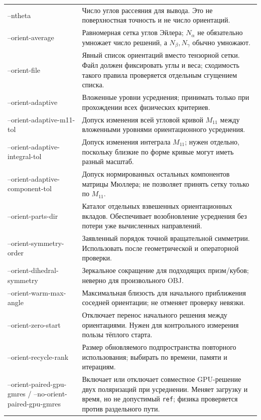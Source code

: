 \documentclass[12pt,a4paper]{article}
\begin{document}
\begin{longtable}{>{\ttfamily\raggedright\arraybackslash}p{}p{}}
--ntheta & Число углов рассеяния для вывода. Это не поверхностная точность и не число ориентаций.\\
--orient-average & Равномерная сетка углов Эйлера; $N_\alpha$ не обязательно умножает число решений, а $N_\beta,N_\gamma$ обычно умножают.\\
--orient-file & Явный список ориентаций вместо тензорной сетки. Файл должен фиксировать углы и веса; сходимость такого правила проверяется отдельным сгущением списка.\\
--orient-adaptive & Вложенные уровни усреднения; принимать только при прохождении всех физических критериев.\\
--orient-adaptive-\allowbreak m11-\allowbreak tol & Допуск изменения всей угловой кривой $M_{11}$ между вложенными уровнями ориентационного усреднения.\\
--orient-adaptive-\allowbreak integral-\allowbreak tol & Допуск изменения интеграла $M_{11}$; нужен отдельно, поскольку близкие по форме кривые могут иметь разный масштаб.\\
--orient-adaptive-\allowbreak component-\allowbreak tol & Допуск нормированных остальных компонентов матрицы Мюллера; не позволяет принять сетку только по $M_{11}$.\\
--orient-parts-dir & Каталог отдельных взвешенных ориентационных вкладов. Обеспечивает возобновление усреднения без потери уже вычисленных направлений.\\
--orient-\allowbreak symmetry-\allowbreak order & Заявленный порядок точной вращательной симметрии. Использовать после геометрической и операторной проверки.\\
--orient-\allowbreak dihedral-\allowbreak symmetry & Зеркальное сокращение для подходящих призм/кубов; неверно для произвольного OBJ.\\
--orient-\allowbreak warm-\allowbreak max-\allowbreak angle & Максимальная близость для начального приближения соседней ориентации; не отменяет проверку невязки.\\
--orient-zero-start & Отключает перенос начального решения между ориентациями. Нужен для контрольного измерения пользы тёплого старта.\\
--orient-recycle-rank & Размер обновляемого подпространства повторного использования; выбирать по времени, памяти и итерациям.\\
--orient-paired-\allowbreak gpu-gmres / --no-orient-paired-\allowbreak gpu-gmres & Включает или отключает совместное GPU-решение двух поляризаций при усреднении. Меняет загрузку и время, но не допустимый \texttt{ref}; физика проверяется против раздельного пути.\\

\end{longtable}
\end{document}
